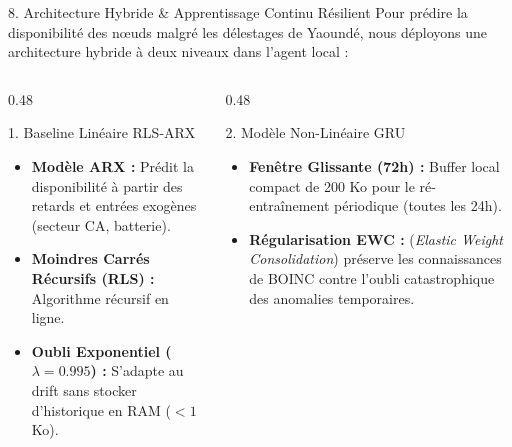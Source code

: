 \documentclass[10pt,aspectratio=169]{beamer}
\begin{document}
\begin{frame}{8. Architecture Hybride \& Apprentissage Continu Résilient}
  Pour prédire la disponibilité des nœuds malgré les délestages de Yaoundé, nous déployons une architecture hybride à deux niveaux dans l'agent local :
  
  \vspace{0.5em}
  \begin{columns}[T]
    \begin{column}{0.48\textwidth}
      \begin{block}{1. Baseline Linéaire RLS-ARX}
        \begin{itemize}
          \item \textbf{Modèle ARX :} Prédit la disponibilité à partir des retards et entrées exogènes (secteur CA, batterie).
          \item \textbf{Moindres Carrés Récursifs (RLS) :} Algorithme récursif en ligne.
          \item \textbf{Oubli Exponentiel ($\lambda = 0.995$) :} S'adapte au drift sans stocker d'historique en RAM ($< 1$ Ko).
        \end{itemize}
      \end{block}
    \end{column}
    
    \begin{column}{0.48\textwidth}
      \begin{block}{2. Modèle Non-Linéaire GRU}
        \begin{itemize}
          \item \textbf{Fenêtre Glissante (72h) :} Buffer local compact de 200 Ko pour le ré-entraînement périodique (toutes les 24h).
          \item \textbf{Régularisation EWC :} (\textit{Elastic Weight Consolidation}) préserve les connaissances de BOINC contre l'oubli catastrophique des anomalies temporaires.
        \end{itemize}
      \end{block}
    \end{column}
  \end{columns}
\end{frame}
\end{document}
